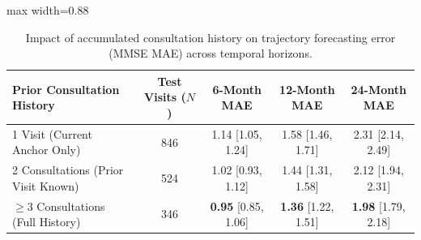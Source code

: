 \begin{table}[t]
\centering
\caption{Impact of accumulated consultation history on trajectory forecasting error (MMSE MAE) across temporal horizons.}
\label{tab:forecast_by_nvisits}
\small
\begin{adjustbox}{max width=0.88\linewidth}
\begin{tabular}{lcccc}
\toprule
\textbf{Prior Consultation History} & \textbf{Test Visits ($N$)} & \textbf{6-Month MAE} & \textbf{12-Month MAE} & \textbf{24-Month MAE} \\
\midrule
1 Visit (Current Anchor Only)       & 846                       & 1.14 [1.05, 1.24]    & 1.58 [1.46, 1.71]     & 2.31 [2.14, 2.49] \\
2 Consultations (Prior Visit Known) & 524                       & 1.02 [0.93, 1.12]    & 1.44 [1.31, 1.58]     & 2.12 [1.94, 2.31] \\
$\ge 3$ Consultations (Full History)& 346                       & \textbf{0.95} [0.85, 1.06] & \textbf{1.36} [1.22, 1.51] & \textbf{1.98} [1.79, 2.18] \\
\bottomrule
\end{tabular}
\end{adjustbox}
\end{table}
